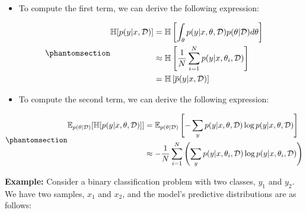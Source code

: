 \documentclass[
  letterpaper,
  numbers=noenddot,
  DIV=11]{scrreprt}
\providecommand{\tightlist}{%
  \setlength{\itemsep}{0pt}\setlength{\parskip}{0pt}}\usepackage{longtable,booktabs,array}
\theoremstyle{definition}
\theoremstyle{plain}
\theoremstyle{plain}
\theoremstyle{remark}
\begin{document}
\begin{itemize}
\tightlist
\item
  To compute the first term, we can derive the following expression:
\end{itemize}

\begin{equation}\phantomsection\label{eq-eq3.3}{\begin{aligned}
\mathbb{H}[p(y|x, \mathcal{D})] &= \mathbb{H}\left[\int_{\theta} p(y|x, \theta, \mathcal{D}) p(\theta | \mathcal{D}) d\theta\right]\\
&\approx \mathbb{H}\left[\frac{1}{N}\sum_{i=1}^{N} p(y|x, \theta_i, \mathcal{D})\right]\\
&= \mathbb{H}\left[\overline{p}(y|x, \mathcal{D})\right]
\end{aligned}}\end{equation}

\begin{itemize}
\tightlist
\item
  To compute the second term, we can derive the following expression:
\end{itemize}

\begin{equation}\phantomsection\label{eq-eq3.4}{\begin{aligned}
\mathbb{E}_{p(\theta|\mathcal{D})} [\mathbb{H}[p(y|x, \theta, \mathcal{D})]] &= \mathbb{E}_{p(\theta|\mathcal{D})} \left[ - \sum_{y} p(y|x, \theta, \mathcal{D}) \log p(y|x, \theta, \mathcal{D}) \right] \\
&\approx - \frac{1}{N} \sum_{i=1}^{N} \left( \sum_{y} p(y|x, \theta_i, \mathcal{D}) \log p(y|x, \theta_i, \mathcal{D}) \right)
\end{aligned}}\end{equation}

\textbf{Example:} Consider a binary classification problem with two
classes, \(y_1\) and \(y_2\). We have two samples, \(x_1\) and \(x_2\),
and the model's predictive distributions are as follows:
\end{document}
